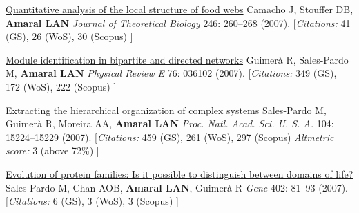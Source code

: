 \NumberedItem{\makebox[0.8cm][r]{[74]}}
\href{/people/amaral/quantitative-analysis-of-the-local-structure-of-food-webs}
{Quantitative analysis of the local structure of food webs}
\newline
Camacho J, Stouffer DB, {\textbf{Amaral LAN}}
\newline
\textit{Journal of Theoretical Biology}
    246:
260--268 (2007).
    \newline
    \hfill [{\em{Citations:}} 41 (GS),
    26 (WoS), 30 (Scopus)
    ]
\newline
\Gap
~
\Gap

\NumberedItem{\makebox[0.8cm][r]{[73]}}
\href{/people/amaral/module-identification-in-bipartite-and-directed-networks}
{Module identification in bipartite and directed networks}
\newline
Guimer\`a R, Sales-Pardo M, {\textbf{Amaral LAN}}
\newline
\textit{Physical Review E}
    76:
036102 (2007).
    \newline
    \hfill [{\em{Citations:}} 349 (GS),
    172 (WoS), 222 (Scopus)
    ]
\newline
\Gap
~
\Gap

\NumberedItem{\makebox[0.8cm][r]{[72]}}
\href{/people/amaral/extracting-the-hierarchical-organization-of-complex-systems}
{Extracting the hierarchical organization of complex systems}
\newline
Sales-Pardo M, Guimer\`a R, Moreira AA, {\textbf{Amaral LAN}}
\newline
\textit{Proc. Natl. Acad. Sci. U. S. A.}
    104:
15224--15229 (2007).
    \newline
    \hfill [{\em{Citations:}} 459 (GS),
    261 (WoS), 297 (Scopus)
        {\hspace*{1cm} \em{Altmetric score:}}  3 (above 72\%)
    ]
\newline
\Gap
~
\Gap

\NumberedItem{\makebox[0.8cm][r]{[71]}}
\href{/people/amaral/evolution-of-protein-families-is-it-possible-to-distinguish-between-domains-of-life}
{Evolution of protein families: Is it possible to distinguish between domains of life?}
\newline
Sales-Pardo M, Chan AOB, {\textbf{Amaral LAN}}, Guimer\`a R
\newline
\textit{Gene}
    402:
81--93 (2007).
    \newline
    \hfill [{\em{Citations:}} 6 (GS),
    3 (WoS), 3 (Scopus)
    ]
\newline
\Gap
~
\Gap

